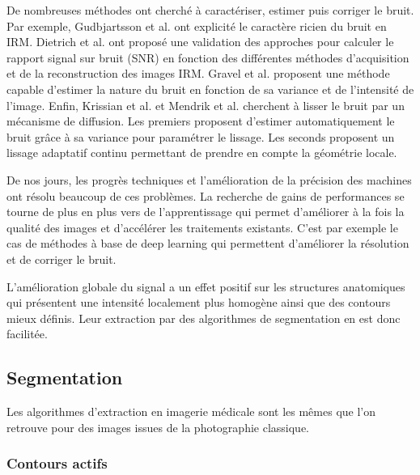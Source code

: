     De nombreuses méthodes ont cherché à caractériser, estimer puis corriger le bruit. Par exemple, Gudbjartsson et al. \cite{Gudbjartsson1995r_Rician_noise_MRI} ont explicité le caractère ricien du bruit en IRM. Dietrich et al. \cite{Dietrich2007_measurement_MR_noise} ont proposé une validation des approches pour calculer le rapport signal sur bruit (SNR) en fonction des différentes méthodes d'acquisition et de la reconstruction des images IRM. Gravel et al. \cite{Gravel_2004_estimate_noise_medical_img} proposent une méthode capable d'estimer la nature du bruit en fonction de sa variance et de l'intensité de l'image. Enfin, Krissian et al. \cite{Krissian_2009_diffusion_MRI} et Mendrik et al. \cite{Mendrik2009_HDCS} cherchent à lisser le bruit par un mécanisme de diffusion. Les premiers proposent d'estimer automatiquement le bruit grâce à sa variance pour paramétrer le lissage. Les seconds proposent un lissage adaptatif continu permettant de prendre en compte la géométrie locale.    
    
    De nos jours, les progrès techniques et l'amélioration de la précision des machines ont résolu beaucoup de ces problèmes. La recherche de gains de performances se tourne de plus en plus vers de l'apprentissage qui permet d'améliorer à la fois la qualité des images et d'accélérer les traitements existants. C'est par exemple le cas de méthodes à base de deep learning \cite{Higaki2019_deep_MRI_CT_quality} qui permettent d'améliorer la résolution et de corriger le bruit.

    L'amélioration globale du signal a un effet positif sur les structures anatomiques qui présentent une intensité localement plus homogène ainsi que des contours mieux définis. Leur extraction par des algorithmes de segmentation en est donc facilitée.

    \subsection{Segmentation}

      Les algorithmes d'extraction en imagerie médicale sont les mêmes que l'on retrouve pour des images issues de la photographie classique. 


      \subsubsection{Contours actifs}

